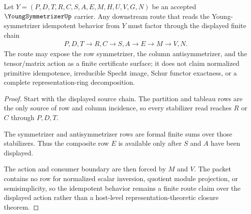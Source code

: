 \begin{theorem}\label{thm:young-symmetrizer-idempotent-route}
Let $Y=(P,D,T,R,C,S,A,E,M,H,U,V,G,N)$ be an accepted $\YoungSymmetrizerUp$ carrier. Any downstream route that reads the Young-symmetrizer idempotent behavior from $Y$ must factor through the displayed finite chain
$$
\begin{gathered}
P,D,T \longrightarrow R,C \longrightarrow S,A \longrightarrow E \longrightarrow M \longrightarrow V,N.
\end{gathered}
$$
The route may expose the row symmetrizer, the column antisymmetrizer, and the tensor/matrix action as a finite certificate surface; it does not claim normalized primitive idempotence, irreducible Specht image, Schur functor exactness, or a complete representation-ring decomposition.
\end{theorem}

\begin{proof}
Start with the displayed source chain. The partition and tableau rows are the only source of row and column incidence, so every stabilizer read reaches $R$ or $C$ through $P,D,T$.

The symmetrizer and antisymmetrizer rows are formal finite sums over those stabilizers. Thus the composite row $E$ is available only after $S$ and $A$ have been displayed.

The action and consumer boundary are then forced by $M$ and $V$. The packet contains no row for normalized scalar inversion, quotient module projection, or semisimplicity, so the idempotent behavior remains a finite route claim over the displayed action rather than a host-level representation-theoretic closure theorem.
\end{proof}




